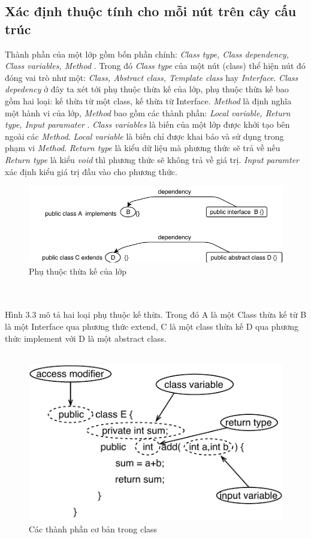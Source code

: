 \documentclass[12pt]{report}
\begin{document}
\subsection{Xác định thuộc tính cho mỗi nút trên cây cấu trúc}

Thành phần của một lớp gồm bốn phần chính: \textit{Class type, Class dependency, Class variables, Method }. Trong đó \textit{Class type} của một nút (class) thể hiện nút đó đóng vai trò như một:\textit{ Class, Abstract class, Template class} hay \textit{Interface}. \textit{Class depedency} ở đây  ta xét tới phụ thuộc thừa kế của lớp, phụ thuộc thừa kế bao gồm hai loại: kế thừa từ một class, kế thừa từ Interface. \textit{Method} là định nghĩa một hành vi của lớp, \textit{Method} bao gồm các thành phần: \textit{Local variable, Return type, Input paramater}  . \textit{Class variables} là biến của một lớp được khởi tạo bên ngoài các \textit{Method}. \textit{Local variable} là biến chỉ được khai báo và sử dụng trong phạm vi \textit{Method}. \textit{Return type} là kiểu dữ liệu mà phương thức sẽ trả về nếu \textit{Return type} là kiểu \textit{void} thì phương thức sẽ không trả về giá trị. \textit{Input paramter} xác định kiểu giá trị đầu vào cho phương thức.
\\
\begin{figure}[!htbp]
	\centering
	\includegraphics[scale=0.45]{images/class_dependency}
	\caption{Phụ thuộc thừa kế của lớp}
	\label{fig:dependecy_extend}
\end{figure}\\\\
Hình 3.3 mô tả hai loại phụ thuộc kế thừa. Trong đó A là một Class thừa kế từ B là một Interface qua phương thức extend, C là một class thừa kế D qua phương thức implement với D là một abstract class.\\\\
\begin{figure}[h]
	\centering
	\includegraphics[scale=0.45]{images/class_method_structure}
	\caption{Các thành phần cơ bản trong class}
	\label{fig:class_structure}
\end{figure}\\
\end{document}
